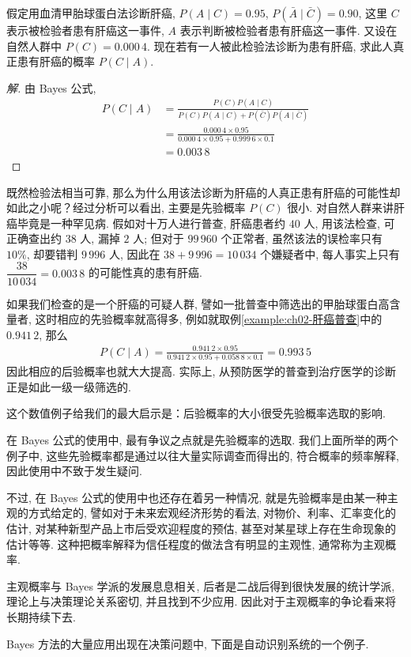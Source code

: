 \documentclass[../../main.tex]{subfiles}
\begin{document}
\begin{example}[血清甲胎球蛋白法诊断肝癌]\label{example:ch02-血清甲胎球蛋白诊断肝癌}
假定用血清甲胎球蛋白法诊断肝癌, $P(A\mid C)=0.95$, $P(\bar{A}\mid\bar{C})=0.90$, 这里 $C$ 表示被检验者患有肝癌这一事件, $A$ 表示判断被检验者患有肝癌这一事件. 又设在自然人群中 $P(C)=0.000\,4$. 现在若有一人被此检验法诊断为患有肝癌, 求此人真正患有肝癌的概率 $P(C\mid A)$.

\begin{proof}[解]
由 Bayes 公式,
\begin{align*}
P(C\mid A)&=\frac{P(C)P(A\mid C)}{P(C)P(A\mid C)+P(\bar{C})P(A\mid\bar{C})}\\
&=\frac{0.000\,4\times 0.95}{0.000\,4\times 0.95+0.999\,6\times 0.1}\\
&=0.003\,8
\end{align*}
\end{proof}

既然检验法相当可靠, 那么为什么用该法诊断为肝癌的人真正患有肝癌的可能性却如此之小呢？经过分析可以看出, 主要是先验概率 $P(C)$ 很小. 对自然人群来讲肝癌毕竟是一种罕见病. 假如对十万人进行普查, 肝癌患者约 $40$ 人, 用该法检查, 可正确查出约 $38$ 人, 漏掉 $2$ 人; 但对于 $99\,960$ 个正常者, 虽然该法的误检率只有 $10\%$, 却要错判 $9\,996$ 人, 因此在 $38+9\,996=10\,034$ 个嫌疑者中, 每人事实上只有 $\dfrac{38}{10\,034}=0.003\,8$ 的可能性真的患有肝癌.

如果我们检查的是一个肝癌的可疑人群, 譬如一批普查中筛选出的甲胎球蛋白高含量者, 这时相应的先验概率就高得多, 例如就取例\ref{example:ch02-肝癌普查}中的 $0.941\,2$, 那么
\begin{align*}
P(C\mid A)=\frac{0.941\,2\times 0.95}{0.941\,2\times 0.95+0.058\,8\times 0.1}=0.993\,5
\end{align*}
因此相应的后验概率也就大大提高. 实际上, 从预防医学的普查到治疗医学的诊断正是如此一级一级筛选的.

这个数值例子给我们的最大启示是：后验概率的大小很受先验概率选取的影响.

在 Bayes 公式的使用中, 最有争议之点就是先验概率的选取. 我们上面所举的两个例子中, 这些先验概率都是通过以往大量实际调查而得出的, 符合概率的频率解释, 因此使用中不致于发生疑问.

不过, 在 Bayes 公式的使用中也还存在着另一种情况, 就是先验概率是由某一种主观的方式给定的, 譬如对于未来宏观经济形势的看法, 对物价、利率、汇率变化的估计, 对某种新型产品上市后受欢迎程度的预估, 甚至对某星球上存在生命现象的估计等等. 这种把概率解释为信任程度的做法含有明显的主观性, 通常称为主观概率.

主观概率与 Bayes 学派的发展息息相关, 后者是二战后得到很快发展的统计学派, 理论上与决策理论关系密切, 并且找到不少应用. 因此对于主观概率的争论看来将长期持续下去.

Bayes 方法的大量应用出现在决策问题中, 下面是自动识别系统的一个例子.
\end{example}
\end{document}
